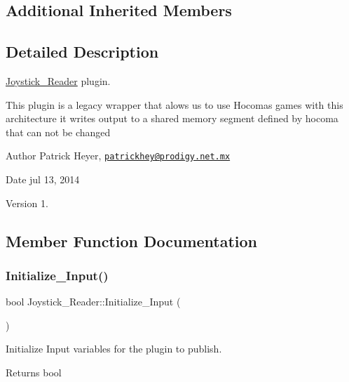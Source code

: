 \subsection*{Additional Inherited Members}


\subsection{Detailed Description}
\hyperlink{class_joystick___reader}{Joystick\+\_\+\+Reader} plugin. 

This plugin is a legacy wrapper that alows us to use Hocoma\textquotesingle{}s games with this architecture it writes output to a shared memory segment defined by hocoma that can not be changed \begin{DoxyAuthor}{Author}
Patrick Heyer, \href{mailto:patrickhey@prodigy.net.mx}{\tt patrickhey@prodigy.\+net.\+mx} 
\end{DoxyAuthor}
\begin{DoxyDate}{Date}
jul 13, 2014 
\end{DoxyDate}
\begin{DoxyVersion}{Version}
1. 
\end{DoxyVersion}


\subsection{Member Function Documentation}
\mbox{\label{class_joystick___reader_af58a274480586227ef68dc550a0ed5fa}} 
\subsubsection{\texorpdfstring{Initialize\+\_\+\+Input()}{Initialize\_Input()}}
{\footnotesize\ttfamily bool Joystick\+\_\+\+Reader\+::\+Initialize\+\_\+\+Input (\begin{DoxyParamCaption}{ }\end{DoxyParamCaption})\hspace{0.3cm}{\ttfamily [virtual]}}



Initialize Input variables for the plugin to publish. 

\begin{DoxyReturn}{Returns}
bool 
\end{DoxyReturn}


